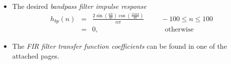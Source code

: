 \documentclass{article}
\begin{document}
\begin{enumerate}
\begin{itemize}
\item The desired {\em bandpass filter impulse response}
\begin{eqnarray}
\label{firbpfinal}
h_{bp}(n) &=& \frac{2\sin(\frac{n\pi}{40}) \cos(\frac{11n\pi}{40})}{n\pi} \hspace{1cm} -100 \leq n \leq 100 \nonumber \\
&=& 0, \hspace{4cm} \mbox{otherwise}
\end{eqnarray}

\item The {\em FIR filter transfer function coefficients} can be found in one of the attached pages.	
\end{itemize}

\end{enumerate}
\end{document}
